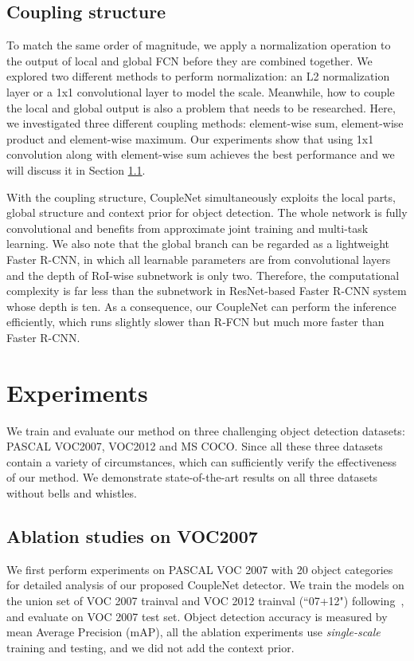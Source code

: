 \documentclass[10pt,twocolumn,letterpaper]{article}
\begin{document}
\subsection{Coupling structure}
To match the same order of magnitude, we apply a normalization operation to the output of local and global FCN before they are combined together. We explored two different methods to perform normalization: an L2 normalization layer or a 1x1 convolutional layer to model the scale. Meanwhile, how to couple the local and global output is also a problem that needs to be researched. Here, we investigated three different coupling methods: element-wise sum, element-wise product and element-wise maximum. Our experiments show that using 1x1 convolution along with element-wise sum achieves the best performance and we will discuss it in Section \ref{Ablation}.

With the coupling structure, CoupleNet simultaneously exploits the local parts, global structure and context prior for object detection. The whole network is fully convolutional and benefits from approximate joint training and multi-task learning. We also note that the global branch can be regarded as a lightweight Faster R-CNN, in which all learnable parameters are from convolutional layers and the depth of RoI-wise subnetwork is only two. Therefore, the computational complexity is far less than the subnetwork in ResNet-based Faster R-CNN system whose depth is ten. As a consequence, our CoupleNet can perform the inference efficiently, which runs slightly slower than R-FCN but much more faster than Faster R-CNN.
\section{Experiments}
We train and evaluate our method on three challenging object detection datasets: PASCAL VOC2007, VOC2012 and MS COCO. Since all these three datasets contain a variety of circumstances, which can sufficiently verify the effectiveness of our method. We demonstrate state-of-the-art results on all three datasets without bells and whistles.
\subsection{Ablation studies on VOC2007}\label{Ablation}
We first perform experiments on PASCAL VOC 2007 with 20 object categories for detailed analysis of our proposed CoupleNet detector. We train the models on the union set of VOC 2007 trainval and VOC 2012 trainval (``07+12") following~\cite{ren2015faster}, and evaluate on VOC 2007 test set. Object detection accuracy is measured by mean Average Precision (mAP), all the ablation experiments use \textit{single-scale} training and testing, and we did not add the context prior.
\end{document}
